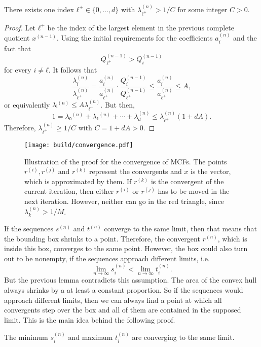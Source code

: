 \begin{lemma}
  \label{lem:lambda-pos}
  There exists one index $ℓ^+ ∈ \{0, …, d\}$ with $λ_{ℓ^+}^{(n)} > 1/C$ for some integer $C > 0$.
\end{lemma}

\begin{proof}
  Let $ℓ^+$ be the index of the largest element in the previous complete quotient $x^{(n-1)}$.
  Using the initial requirements for the coefficients $a_i^{(n)}$ and the fact
  that
  \[
    Q_{ℓ^+}^{(n-1)} > Q_i^{(n-1)}
  \]
  for every $i ≠ ℓ$.
  It follows that
  \[
    \frac{λ_i^{(n)}}{λ_{ℓ^+}^{(n)}}
    = \frac{a_i^{(n)}}{a_{ℓ^+}^{(n)}} · \frac{Q_i^{(n-1)}}{Q_{ℓ^+}^{(n-1)}}
    ≤ \frac{a_i^{(n)}}{a_{ℓ^+}^{(n)}}
    ≤ A,
  \]
  or equivalently $λᵢ^{(n)} ≤ A λ_{ℓ^+}^{(n)}$.
  But then,
  \[
    1 = λ₀^{(n)} + λ₁^{(n)} + ⋯ + λ_d^{(n)} ≤ λ_{ℓ^+}^{(n)} (1 + dA).
  \]
  Therefore, $λ_{ℓ^+}^{(n)} ≥ 1/C$ with $C = 1 + dA > 0$.
\end{proof}

\begin{figure}[tbp]
  \centering
  \texttt{[image: build/convergence.pdf]}
  \caption{
    Illustration of the proof for the convergence of MCFs.
    The points $r^{(i)}, r^{(j)}$ and $r^{(k)}$ represent the convergents and $x$ is
    the vector, which is approximated by them.
    If $r^{(k)}$ is the convergent of the current iteration,
    then either $r^{(i)}$ or $r^{(j)}$ has to be moved in the next iteration.
    However, neither can go in the red triangle,
    since $λ_k^{(n)} > 1/M$.
  }
  \label{fig:convergence}
\end{figure}

If the sequences $s^{(n)}$ and $t^{(n)}$ converge to the same limit,
then that means that the bounding box shrinks to a point.
Therefore, the convergent $r^{(n)}$, which is inside this box, converges to the
same point.
However, the box could also turn out to be nonempty,
if the sequences approach different limits, i.e.
\[
  \lim_{n → ∞} s_i^{(n)} < \lim_{n → ∞} t_i^{(n)}.
\]
But the previous lemma contradicts this assumption.
The area of the convex hull always shrinks by a at least a constant proportion.
So if the sequences would approach different limits, then we can always find a
point at which all convergents step over the box and all of them are contained
in the supposed limit.
This is the main idea behind the following proof.

\begin{lemma}
  \label{lem:min-max-conv}
  The minimum $s_i^{(n)}$ and maximum $t_i^{(n)}$ are converging to the same
  limit.
\end{lemma}

